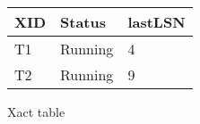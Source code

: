   \centering
  \begin{tabular}{|l|l|l|}
    \hline
    XID & Status & lastLSN \\
    \hline
    T1  & Running & 4 \\
    T2  & Running & 9 \\
    \hline
  \end{tabular}
  \caption{Xact table}
  \label{tab:xact}
